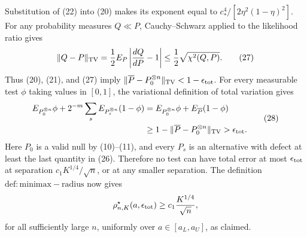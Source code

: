 Substitution of (22) into (20) makes its exponent equal to \(c_*^4/[2\eta^2(1-\eta)^2]\).  For any probability measures \(Q\ll P\), Cauchy--Schwarz applied to the likelihood ratio gives
\[
 \|Q-P\|_{\rm TV}
 =\frac12E_P\left|\frac{dQ}{dP}-1\right|
 \leq\frac12\sqrt{\chi^2(Q,P)}.
 \tag{27}
\]
Thus (20), (21), and (27) imply
\(\|\overline P-P_0^{\otimes n}\|_{\rm TV}<1-\epsilon_{\rm tot}\).  For every measurable test \(\phi\) taking values in \([0,1]\), the variational definition of total variation gives
\[
 \begin{aligned}
 E_{P_0^{\otimes n}}\phi
 +2^{-m}\sum_sE_{P_s^{\otimes n}}(1-\phi)
 &=E_{P_0^{\otimes n}}\phi+E_{\overline P}(1-\phi) \\
 &\geq1-\|\overline P-P_0^{\otimes n}\|_{\rm TV}
 >\epsilon_{\rm tot}.
 \end{aligned}
 \tag{28}
\]
Here \(P_0\) is a valid null by (10)--(11), and every \(P_s\) is an alternative with defect at least the last quantity in (26).  Therefore no test can have total error at most \(\epsilon_{\rm tot}\) at separation \(c_1K^{1/4}/\sqrt n\), or at any smaller separation.  The definition \(\mathrm{def:minimax-radius}\) now gives
\[
 \rho^\star_{n,K}(a,\epsilon_{\rm tot})
 \geq c_1\frac{K^{1/4}}{\sqrt n},
\]
for all sufficiently large \(n\), uniformly over \(a\in[a_L,a_U]\), as claimed.

